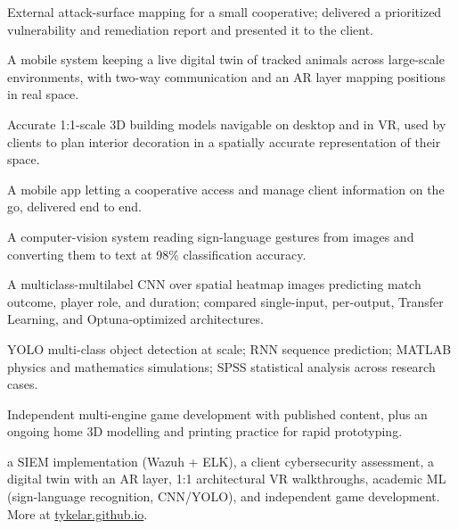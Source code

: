 \documentclass[10pt,a4paper]{article}
\newcommand{\cvmoreprojects}[1]{\needspace{2\baselineskip}\vspace{2pt}{\bfseries Also built:} #1\par}
\newcommand{\cvproject}[3]{\needspace{4\baselineskip}\vspace{2pt}{\bfseries #1}\par\vspace{-4pt}{\itshape\small Tech stack: #2\par}\vspace{-4pt}#3\par}
\begin{document}
\cvproject{Cybersecurity Assessment \& Footprinting (Client Project)}{OSINT · Offensive security · Vulnerability assessment}{External attack-surface mapping for a small cooperative; delivered a prioritized vulnerability and remediation report and presented it to the client.}

\cvproject{Digital Twin \& Animal Tracking App}{Kotlin · React Native · Firebase · A-Frame}{A mobile system keeping a live digital twin of tracked animals across large-scale environments, with two-way communication and an AR layer mapping positions in real space.}

\cvproject{1:1 Architectural VR Walkthrough (Client Project)}{Unity · 3D modelling · Desktop + headset}{Accurate 1:1-scale 3D building models navigable on desktop and in VR, used by clients to plan interior decoration in a spatially accurate representation of their space.}

\cvproject{Mobile Client-Management App (Cooperative)}{React Native · Firebase}{A mobile app letting a cooperative access and manage client information on the go, delivered end to end.}

\cvproject{Sign Language Recognition: Image-to-Text (Academic)}{Python · Computer vision · ML}{A computer-vision system reading sign-language gestures from images and converting them to text at 98\% classification accuracy.}

\cvproject{CNN Match Classification: League of Legends (Academic)}{Python · CNNs · Transfer Learning · Optuna}{A multiclass-multilabel CNN over spatial heatmap images predicting match outcome, player role, and duration; compared single-input, per-output, Transfer Learning, and Optuna-optimized architectures.}

\cvproject{Further Academic ML \& Computing}{Python · YOLO · RNNs · MATLAB · SPSS}{YOLO multi-class object detection at scale; RNN sequence prediction; MATLAB physics and mathematics simulations; SPSS statistical analysis across research cases.}

\cvproject{Game Design \& Development and Maker Practice}{Unity · Godot · Blender · VRChat SDK · FDM printing}{Independent multi-engine game development with published content, plus an ongoing home 3D modelling and printing practice for rapid prototyping.}

\cvmoreprojects{a SIEM implementation (Wazuh + ELK), a client cybersecurity assessment, a digital twin with an AR layer, 1:1 architectural VR walkthroughs, academic ML (sign-language recognition, CNN/YOLO), and independent game development. More at \href{https://tykelar.github.io}{tykelar.github.io}.}
\end{document}
